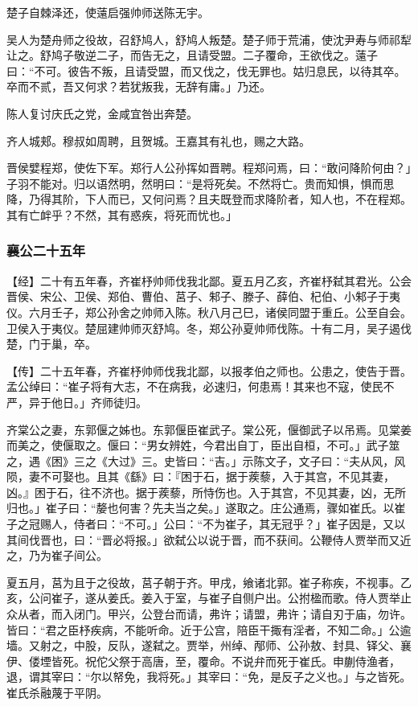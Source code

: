 \documentclass[]{article}
\begin{document}
楚子自棘泽还，使薳启强帅师送陈无宇。

吴人为楚舟师之役故，召舒鸠人，舒鸠人叛楚。楚子师于荒浦，使沈尹寿与师祁犁让之。舒鸠子敬逆二子，而告无之，且请受盟。二子覆命，王欲伐之。薳子曰：``不可。彼告不叛，且请受盟，而又伐之，伐无罪也。姑归息民，以待其卒。卒而不贰，吾又何求？若犹叛我，无辞有庸。」乃还。

陈人复讨庆氏之党，金咸宜咎出奔楚。

齐人城郏。穆叔如周聘，且贺城。王嘉其有礼也，赐之大路。

晋侯嬖程郑，使佐下军。郑行人公孙挥如晋聘。程郑问焉，曰：``敢问降阶何由？」子羽不能对。归以语然明，然明曰：``是将死矣。不然将亡。贵而知惧，惧而思降，乃得其阶，下人而已，又何问焉？且夫既登而求降阶者，知人也，不在程郑。其有亡衅乎？不然，其有惑疾，将死而忧也。」

\hypertarget{header-n2177}{%
\subsubsection{襄公二十五年}\label{header-n2177}}

【经】二十有五年春，齐崔杼帅师伐我北鄙。夏五月乙亥，齐崔杼弑其君光。公会晋侯、宋公、卫侯、郑伯、曹伯、莒子、邾子、滕子、薛伯、杞伯、小邾子于夷仪。六月壬子，郑公孙舍之帅师入陈。秋八月己巳，诸侯同盟于重丘。公至自会。卫侯入于夷仪。楚屈建帅师灭舒鸠。冬，郑公孙夏帅师伐陈。十有二月，吴子遏伐楚，门于巢，卒。

【传】二十五年春，齐崔杼帅师伐我北鄙，以报孝伯之师也。公患之，使告于晋。孟公绰曰：``崔子将有大志，不在病我，必速归，何患焉！其来也不寇，使民不严，异于他日。」齐师徒归。

齐棠公之妻，东郭偃之姊也。东郭偃臣崔武子。棠公死，偃御武子以吊焉。见棠姜而美之，使偃取之。偃曰：``男女辨姓，今君出自丁，臣出自桓，不可。」武子筮之，遇《困》三之《大过》三。史皆曰：``吉。」示陈文子，文子曰：``夫从风，风陨，妻不可娶也。且其《繇》曰：『困于石，据于蒺藜，入于其宫，不见其妻，凶。』困于石，往不济也。据于蒺藜，所恃伤也。入于其宫，不见其妻，凶，无所归也。」崔子曰：``嫠也何害？先夫当之矣。」遂取之。庄公通焉，骤如崔氏。以崔子之冠赐人，侍者曰：``不可。」公曰：``不为崔子，其无冠乎？」崔子因是，又以其间伐晋也，曰：``晋必将报。」欲弑公以说于晋，而不获间。公鞭侍人贾举而又近之，乃为崔子间公。

夏五月，莒为且于之役故，莒子朝于齐。甲戌，飨诸北郭。崔子称疾，不视事。乙亥，公问崔子，遂从姜氏。姜入于室，与崔子自侧户出。公拊楹而歌。侍人贾举止众从者，而入闭门。甲兴，公登台而请，弗许；请盟，弗许；请自刃于庙，勿许。皆曰：``君之臣杼疾病，不能听命。近于公宫，陪臣干掫有淫者，不知二命。」公逾墙。又射之，中股，反队，遂弑之。贾举，州绰、邴师、公孙敖、封具、铎父、襄伊、偻堙皆死。祝佗父祭于高唐，至，覆命。不说弁而死于崔氏。申蒯侍渔者，退，谓其宰曰：``尔以帑免，我将死。」其宰曰：``免，是反子之义也。」与之皆死。崔氏杀融蔑于平阴。
\end{document}
